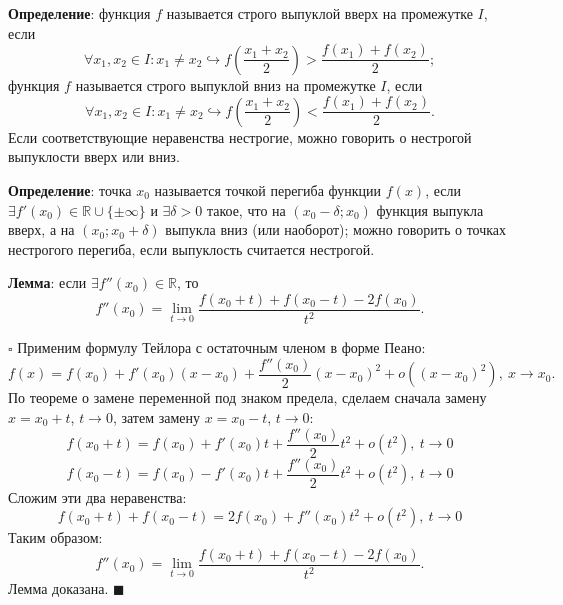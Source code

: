 \documentclass[12pt, a4paper, reqno]{article}
\begin{document}
    \textbf{Определение}: функция $f$ называется строго выпуклой вверх на промежутке $I$, если
    \begin{equation*}
        \forall x_1, x_2 \in I: x_1\neq x_2\hookrightarrow f\left(\dfrac{x_1 + x_2}{2}\right) >
        \dfrac{f(x_1) + f(x_2)}{2};
    \end{equation*}
    функция $f$ называется строго выпуклой вниз на промежутке $I$, если
    \begin{equation*}
        \forall x_1, x_2 \in I: x_1\neq x_2\hookrightarrow f\left(\dfrac{x_1 + x_2}{2}\right) <
        \dfrac{f(x_1) + f(x_2)}{2}.
    \end{equation*}
    Если соответствующие неравенства нестрогие, можно говорить о нестрогой выпуклости вверх или вниз.

    \textbf{Определение}: точка $x_0$ называется точкой перегиба функции $f(x)$, если
    $\exists f'(x_0) \in \mathbb{R} \cup \{\pm \infty\}$ и $\exists\delta > 0$ такое, что на
    $(x_0 - \delta; x_0)$ функция выпукла вверх, а на $(x_0; x_0 + \delta)$ выпукла вниз (или наоборот);
    можно говорить о точках нестрогого перегиба, если выпуклость считается нестрогой.

    \textbf{Лемма}: если $\exists f''(x_0)\in\mathbb{R}$, то
    \begin{equation*}
        f''(x_0) = \lim\limits_{t\to 0} \dfrac{f(x_0 + t) + f(x_0 - t) - 2f(x_0)}{t^2}.
    \end{equation*}

    $\square$ Применим формулу Тейлора с остаточным членом в форме Пеано:
    \begin{equation*}
        f(x) = f(x_0) + f'(x_0)(x - x_0) + \dfrac{f''(x_0)}{2}(x - x_0)^2 + o\left((x - x_0)^2\right),\
        x\to x_0.
    \end{equation*}
    По теореме о замене переменной под знаком предела, сделаем сначала замену $x = x_0 + t$,
    $t\to 0$, затем замену $x = x_0 - t$, $t\to 0$:
    \begin{equation*}
        f(x_0 + t) = f(x_0) + f'(x_0)t + \dfrac{f''(x_0)}{2}t^2 + o(t^2),\ t\to 0
    \end{equation*}
    \begin{equation*}
        f(x_0 - t) = f(x_0) - f'(x_0)t + \dfrac{f''(x_0)}{2}t^2 + o(t^2),\ t\to 0
    \end{equation*}
    Сложим эти два неравенства:
    \begin{equation*}
        f(x_0 + t) + f(x_0 - t) = 2f(x_0) + f''(x_0)t^2 + o(t^2),\ t\to 0
    \end{equation*}
    Таким образом:
    \begin{equation*}
        f''(x_0) = \lim\limits_{t\to 0} \dfrac{f(x_0 + t) + f(x_0 - t) - 2f(x_0)}{t^2}.
    \end{equation*}
    Лемма доказана. $\blacksquare$
\end{document}
